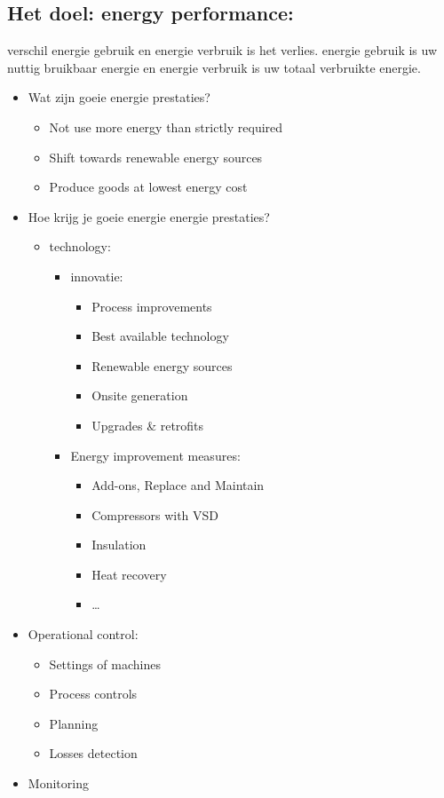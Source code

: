 \documentclass[12pt]{article}
\begin{document}
\subsection{Het doel: energy performance:}
verschil energie gebruik en energie verbruik is het verlies.
energie gebruik is uw nuttig bruikbaar energie en energie verbruik is uw totaal verbruikte energie.
\begin{itemize}
    \item[]Wat zijn goeie energie prestaties?\begin{itemize}
        \item Not use more energy than strictly required
        \item Shift towards renewable energy sources
        \item Produce goods at lowest energy cost
    \end{itemize}
    \item[] Hoe krijg je goeie energie energie prestaties?\begin{itemize}
        \item technology:\begin{itemize}
            \item innovatie:\begin{itemize}
                \item Process improvements 
                \item Best available technology 
                \item Renewable energy sources
                \item Onsite generation
                \item Upgrades \& retrofits
            \end{itemize}
            \item Energy improvement measures:\begin{itemize}
                \item Add-ons, Replace and Maintain 
                \item Compressors with VSD
                \item Insulation 
                \item Heat recovery
                \item \dots
            \end{itemize}
        \end{itemize}
    \end{itemize}
    \item Operational control:\begin{itemize}
        \item Settings of machines 
        \item Process controls
        \item Planning
        \item Losses detection
    \end{itemize}
    \item Monitoring
\end{itemize}
\end{document}
